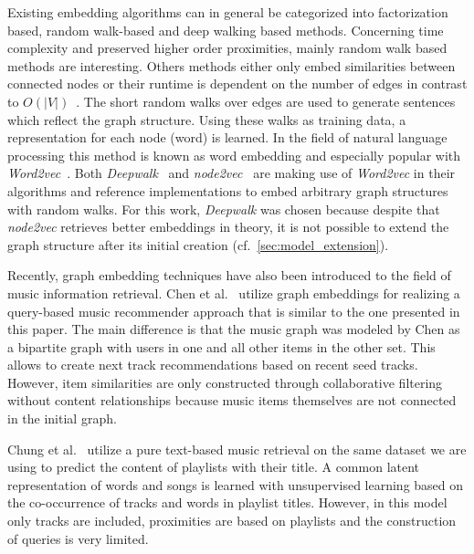 \documentclass[sigconf]{acmart}
\begin{document}
Existing embedding algorithms can in general be categorized into factorization based, random walk-based and deep walking based methods. Concerning time complexity and preserved higher order proximities, mainly random walk based methods are interesting. Others methods either only embed similarities between connected nodes or their runtime is dependent on the number of edges in contrast to $ O(|V|) $~\cite{goyal2017graph}. The short random walks over edges are used to generate sentences which reflect the graph structure. Using these walks as training data, a representation for each node (word) is learned. In the field of natural language processing this method is known as word embedding and especially popular with \emph{Word2vec}~\cite{mikolov2013efficient}. Both \emph{Deepwalk}~\cite{perozzi2014deepwalk} and \emph{node2vec}~\cite{grover2016node2vec} are making use of \emph{Word2vec} in their algorithms and reference implementations to embed arbitrary graph structures with random walks. For this work, \emph{Deepwalk} was chosen because despite that \emph{node2vec} retrieves better embeddings in theory, it is not possible to extend the graph structure after its initial creation (cf.~\ref{sec:model_extension}).

Recently, graph embedding techniques have also been introduced to the field of music information retrieval. Chen et al.~\cite{Chen:2016:QMR:2959100.2959169} utilize graph embeddings for realizing a query-based music recommender approach that is similar to the one presented in this paper. The main difference is that the music graph was modeled by Chen as a bipartite graph with users in one and all other items in the other set. This allows to create next track recommendations based on recent seed tracks. However, item similarities are only constructed through collaborative filtering without content relationships because music items themselves are not connected in the initial graph. 

Chung et al.~\cite{chungexploiting} utilize a pure text-based music retrieval on the same dataset we are using to predict the content of playlists with their title. A common latent representation of words and songs is learned with unsupervised learning based on the co-occurrence of tracks and words in playlist titles. However, in this model only tracks are included, proximities are based on playlists and the construction of queries is very limited. \\
\end{document}
